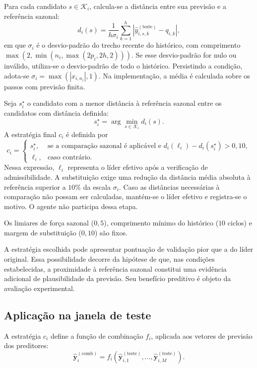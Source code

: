 Para cada candidato $s \in \mathcal{K}_i$, calcula-se a distância entre sua previsão e a referência sazonal:
\[
    d_i(s)
    =
    \frac{1}{h\sigma_i}
    \sum_{k=1}^{h}
    \left|
        \hat{y}_{i,s,k}^{(\mathrm{teste})}-q_{i,k}
    \right|,
\]
em que $\sigma_i$ é o desvio-padrão do trecho recente do histórico, com comprimento $\max(2,\min(n_i,\max(2p_i,2h,2)))$. Se esse desvio-padrão for nulo ou inválido, utiliza-se o desvio-padrão de todo o histórico. Persistindo a condição, adota-se
$\sigma_i=\max(|x_{i,n_i}|,1)$. Na implementação, a média é calculada sobre os passos com previsão finita.

Seja $s_i^{\star}$ o candidato com a menor distância à referência sazonal entre os candidatos com distância definida:
\[
    s_i^{\star}
    =
    \arg\min_{s \in \mathcal{K}_i} d_i(s).
\]
A estratégia final $c_i$ é definida por
\[
    c_i =
    \begin{cases}
        s_i^{\star},
        & \text{se a comparação sazonal é aplicável e }
          d_i(\ell_i)-d_i(s_i^{\star})>0{,}10,\\
        \ell_i,
        & \text{caso contrário}.
    \end{cases}
\]
Nessa expressão, $\ell_i$ representa o líder efetivo após a verificação de admissibilidade. A substituição exige uma redução da distância média absoluta à referência superior a $10\%$ da escala $\sigma_i$. Caso as distâncias necessárias à comparação não possam ser calculadas, mantém-se o líder efetivo e registra-se o motivo. O agente não participa dessa etapa.

Os limiares de força sazonal ($0{,}5$), comprimento mínimo do histórico ($10$ ciclos) e margem de substituição ($0{,}10$) são fixos.

A estratégia escolhida pode apresentar pontuação de validação pior que a do líder original. Essa possibilidade decorre da hipótese de que, nas condições estabelecidas, a proximidade à referência sazonal constitui uma evidência adicional de plausibilidade da previsão. Seu benefício preditivo é objeto da avaliação experimental.

\subsection{Aplicação na janela de teste}

A estratégia $c_i$ define a função de combinação $f_i$, aplicada aos vetores de previsão dos preditores:
\[
    \hat{\mathbf{y}}_i^{(\mathrm{comb})}
    =
    f_i\!\left(
        \hat{\mathbf{y}}_{i,1}^{(\mathrm{teste})},
        \ldots,
        \hat{\mathbf{y}}_{i,M}^{(\mathrm{teste})}
    \right).
\]

